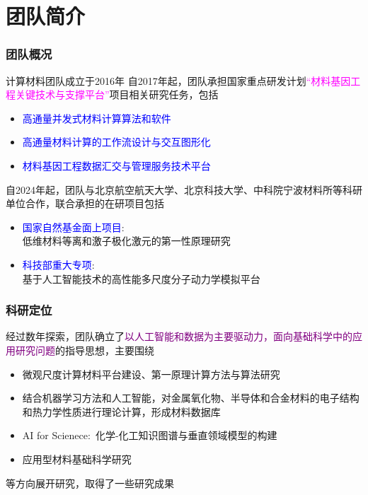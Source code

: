 \small
\section{团队简介}
\frame
{
	\frametitle{团队概况}
	计算材料团队成立于\textrm{2016}年
	\vskip 2pt 
	自\textrm{2017}年起，团队承担国家重点研发计划\textcolor{magenta}{``材料基因工程关键技术与支撑平台''}项目相关研究任务，包括
\begin{itemize}
		\item \textcolor{blue}{高通量并发式材料计算算法和软件}
		\item \textcolor{blue}{高通量材料计算的工作流设计与交互图形化}
		\item \textcolor{blue}{材料基因工程数据汇交与管理服务技术平台}
	\end{itemize}
	\vskip 2pt
	自\textrm{2024}年起，团队与北京航空航天大学、北京科技大学、中科院宁波材料所等科研单位合作，联合承担的在研项目包括
\begin{itemize}
	\item \textcolor{blue}{国家自然基金面上项目}:\\
低维材料等离和激子极化激元的第一性原理研究%
	\item \textcolor{blue}{科技部重大专项}:\\
			基于人工智能技术的高性能多尺度分子动力学模拟平台%
	\end{itemize}
}
	
\frame
{
\frametitle{科研定位}
	经过数年探索，团队确立了\textcolor{purple}{以人工智能和数据为主要驱动力，面向基础科学中的应用研究问题}的指导思想，主要围绕
	\begin{itemize}
	 \setlength{\itemsep}{3pt}
		\item 微观尺度计算材料平台建设、第一原理计算方法与算法研究
		\item 结合机器学习方法和人工智能，对金属氧化物、半导体和合金材料的电子结构和热力学性质进行理论计算，形成材料数据库
		\item \textrm{AI for Scienece}:~化学-化工知识图谱与垂直领域模型的构建
		\item 应用型材料基础科学研究\\
	{\fontsize{7.2pt}{6.2pt}}
	\end{itemize}
	等方向展开研究，取得了一些研究成果
}

